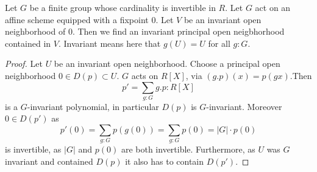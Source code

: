 %
\begin{lemma}
	Let $G$ be a finite group whose cardinality is invertible in $R$. Let $G$ act on an affine scheme equipped with a fixpoint $0$. Let $V$ be an invariant open neighborhood of 0. Then we find an invariant principal open neigbhorhood contained in $V$. Invariant means here that $g(U) = U$ for all $g : G$.%
\end{lemma}
\begin{proof}
	Let $U$ be an invariant open neighborhood. Choose a principal open neighborhood $0 \in D(p) \subset U$. $G$ acts on $R[X]$, via $(g.p)(x) = p(g x)$.Then 
	\[p' = \sum_{g : G} g . p : R[X]\]
	is a $G$-invariant polynomial, in particular $D(p)$ is $G$-invariant. Moreover $0 \in D(p')$ as
	\[
	p'(0) = \sum_{g : G} p(g(0)) = \sum_{g : G} p (0) = |G| \cdot p(0) 
	\]
	is invertible, as $|G|$ and $p(0)$ are both invertible. Furthermore, as $U$ was $G$ invariant and contained $D(p)$ it also has to contain $D(p')$.
\end{proof}

